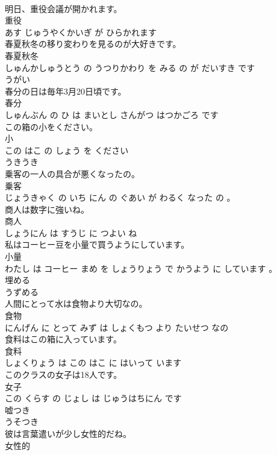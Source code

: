 \documentclass[8pt]{extreport}
\begin{document}
\begin{CJK}{UTF8}{min}
\\	明日、重役会議が開かれます。	
\\	重役 
\\	あす じゅうやくかいぎ が ひらかれます			
\\	春夏秋冬の移り変わりを見るのが大好きです。	
\\	春夏秋冬 
\\	しゅんかしゅうとう の うつりかわり を みる の が だいすき です			
\\	うがい	
\\	春分の日は毎年3月20日頃です。	
\\	春分 
\\	しゅんぶん の ひ は まいとし さんがつ はつかごろ です			
\\	この箱の小をください。	
\\	小 
\\	この はこ の しょう を ください			
\\	うきうき	
\\	乗客の一人の具合が悪くなったの。	
\\	乗客 
\\	じょうきゃく の いち にん の ぐあい が わるく なった の 。			
\\	商人は数字に強いね。	
\\	商人 
\\	しょうにん は すうじ に つよい ね			
\\	私はコーヒー豆を小量で買うようにしています。	
\\	小量 
\\	わたし は コーヒー まめ を しょうりょう で かうよう に しています 。			
\\	埋める	
\\	うずめる		
\\	人間にとって水は食物より大切なの。	
\\	食物 
\\	にんげん に とって みず は しょくもつ より たいせつ なの			
\\	食料はこの箱に入っています。	
\\	食料 
\\	しょくりょう は この はこ に はいって います			
\\	このクラスの女子は18人です。	
\\	女子 
\\	この くらす の じょし は じゅうはちにん です			
\\	嘘つき	
\\	うそつき		
\\	彼は言葉遣いが少し女性的だね。	
\\	女性的 

\end{CJK}
\end{document}
